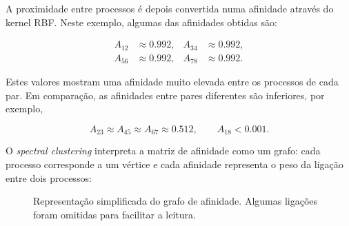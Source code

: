 A proximidade entre processos é depois convertida numa afinidade através
do kernel RBF. Neste exemplo, algumas das afinidades obtidas são:

\begin{equation}
\begin{aligned}
    A_{12} &\approx 0.992, &
    A_{34} &\approx 0.992,\\
    A_{56} &\approx 0.992, &
    A_{78} &\approx 0.992.
\end{aligned}
\end{equation}

Estes valores mostram uma afinidade muito elevada entre os processos de
cada par. Em comparação, as afinidades entre pares diferentes são
inferiores, por exemplo,

\begin{equation}
    A_{23}\approx A_{45}\approx A_{67}\approx 0.512,
    \qquad
    A_{18}<0.001.
\end{equation}

O \textit{spectral clustering} interpreta a matriz de afinidade como um
grafo: cada processo corresponde a um vértice e cada afinidade representa
o peso da ligação entre dois processos:

\begin{figure}[H]
\centering
{}
\caption{Representação simplificada do grafo de afinidade. Algumas ligações foram omitidas para facilitar a leitura.}
\label{fig:grafo-afinidade-exemplo}
\end{figure}

